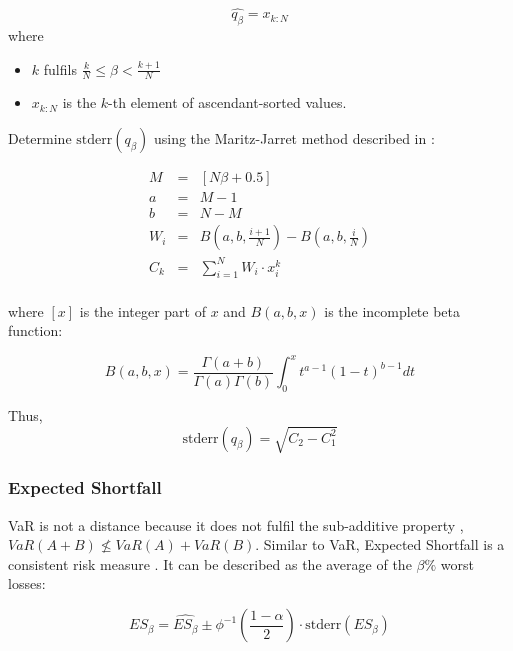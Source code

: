 \documentclass[a4paper,12pt,final]{article}
\begin{document}
\begin{displaymath}
\widehat{q_{\beta}} = x_{k:N}
\end{displaymath}
where
\begin{itemize}
\item $k$ fulfils $\frac{k}{N} \leq \beta < \frac{k+1}{N}$
\item $x_{k:N}$ is the $k$-th element of ascendant-sorted values.
\end{itemize}

Determine $\textrm{stderr}(q_{\beta})$ using the Maritz-Jarret method described
in \cite{quant:algor}:

\begin{displaymath}
\begin{array}{rcl}
M   & = & [N \beta + 0.5]  \\
a   & = & M - 1            \\
b   & = & N - M            \\
W_i & = & B(a,b,\frac{i+1}{N}) - B(a,b,\frac{i}{N}) \\
C_k & = & \sum_{i=1}^{N} W_i \cdot x_i^k \\
\end{array}
\end{displaymath}

where $[x]$ is the integer part of $x$ and $B(a,b,x)$ is the incomplete beta 
function:

\begin{displaymath}
B(a,b,x)=\frac{\Gamma(a+b)}{\Gamma(a)\Gamma(b)}\int_0^x t^{a-1} (1-t)^{b-1} dt
\end{displaymath}

Thus,
\begin{displaymath}
\textrm{stderr}(q_{\beta}) = \sqrt{C_2 - C_1^2}
\end{displaymath}

\subsubsection{Expected Shortfall}
VaR is not a distance because it does not fulfil the sub-additive property 
\cite{var:varbad}, $VaR(A+B) \nleq VaR(A)+VaR(B)$. Similar to VaR, Expected 
Shortfall is a consistent risk measure \cite{var:eshortfall}. It can be described
as the average of the $\beta\%$ worst losses:

\begin{displaymath}
ES_{\beta} = \widehat{ES_{\beta}} \pm \phi^{-1}\left(\frac{1-\alpha}{2}\right) \cdot \textrm{stderr}(ES_{\beta})
\end{displaymath}
\end{document}
